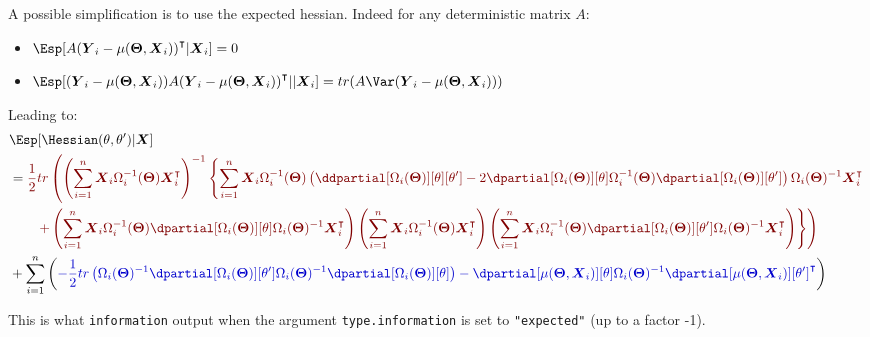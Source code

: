 \documentclass[12pt]{article}
\newcommand{\darkblue}{blue!80!black}
\newcommand{\darkred}{red!50!black}
\newcommand\trans[1]{{#1}^\intercal}%
\newcommand{\param}{\Theta}
\newcommand{\Vparam}{\boldsymbol{\param}}
\newcommand{\VX}{\boldsymbol{X}}
\newcommand{\VY}{\boldsymbol{Y}}
\begin{document}
\bigskip

A possible simplification is to use the expected hessian. Indeed for
any deterministic matrix \(A\):
\begin{itemize}
\item \(\Esp[A \trans{(\VY_i-\mu(\Vparam,\VX_i))}|\VX_i] = 0\)
\item \(\Esp[(\VY_i-\mu(\Vparam,\VX_i)) A \trans{(\VY_i-\mu(\Vparam,\VX_i))}||\VX_i] = tr(A \Var(\VY_i-\mu(\Vparam,\VX_i)))\)
\end{itemize}
Leading to:
\begin{align*}
 & \Esp[\Hessian(\theta,\theta^{\prime})|\VX] \\
 &= \textcolor{\darkred}{ \frac{1}{2} tr \left( \left(\sum_{i=1}^n \VX_i \Omega_i^{-1}(\Vparam) \trans{\VX}_i\right)^{-1}  \left\{ \sum_{i=1}^n \VX_i \Omega_i^{-1}(\Vparam) \left( \ddpartial[\Omega_i(\Vparam)][\theta][\theta^{\prime}] - 2 \dpartial[\Omega_i(\Vparam)][\theta]  \Omega_i^{-1}(\Vparam) \dpartial[\Omega_i(\Vparam)][\theta^{\prime}]\right) \Omega_i(\Vparam)^{-1} \trans{\VX}_i \right.  \right.}  \\
 & \textcolor{\darkred}{ \left. \left. \qquad +  \left(\sum_{i=1}^n \VX_i \Omega_i^{-1}(\Vparam) \dpartial[\Omega_i(\Vparam)][\theta] \Omega_i(\Vparam)^{-1} \trans{\VX}_i\right) \left(\sum_{i=1}^n \VX_i \Omega_i^{-1}(\Vparam) \trans{\VX}_i \right) \left(\sum_{i=1}^n \VX_i \Omega_i^{-1}(\Vparam) \dpartial[\Omega_i(\Vparam)][\theta^{\prime}] \Omega_i(\Vparam)^{-1} \trans{\VX}_i\right) \right\} \right) } \\
 & + \sum_{i=1}^n \left( \textcolor{\darkblue}{
- \frac{1}{2} tr\left(\Omega_i(\Vparam)^{-1} \dpartial[\Omega_i(\Vparam)][\theta^{\prime}] \Omega_i(\Vparam)^{-1} \dpartial[\Omega_i(\Vparam)][\theta]\right)
 - \dpartial[\mu(\Vparam,\VX_i)][\theta] \Omega_i(\Vparam)^{-1} \trans{\dpartial[\mu(\Vparam,\VX_i)][\theta^{\prime}]}
 } \right) \\
\end{align*}

This is what \texttt{information} output when the argument \texttt{type.information}
is set to \texttt{"expected"} (up to a factor -1).
\end{document}
